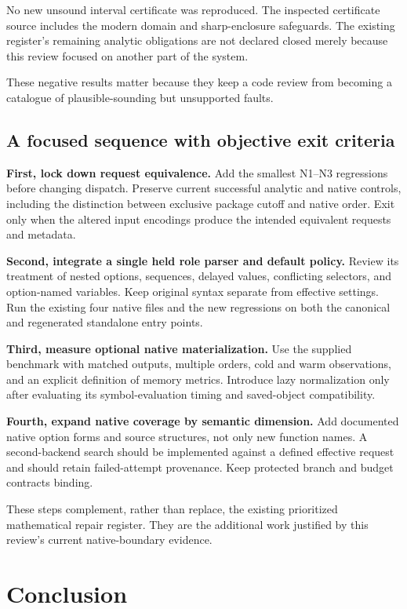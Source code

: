 \documentclass[11pt,a4paper]{article}
\begin{document}
No new unsound interval certificate was reproduced. The inspected certificate source includes the modern domain and sharp-enclosure safeguards. The existing register's remaining analytic obligations are not declared closed merely because this review focused on another part of the system.

These negative results matter because they keep a code review from becoming a catalogue of plausible-sounding but unsupported faults.

\subsection{A focused sequence with objective exit criteria}

\textbf{First, lock down request equivalence.} Add the smallest N1--N3 regressions before changing dispatch. Preserve current successful analytic and native controls, including the distinction between exclusive package cutoff and native order. Exit only when the altered input encodings produce the intended equivalent requests and metadata.

\textbf{Second, integrate a single held role parser and default policy.} Review its treatment of nested options, sequences, delayed values, conflicting selectors, and option-named variables. Keep original syntax separate from effective settings. Run the existing four native files and the new regressions on both the canonical and regenerated standalone entry points.

\textbf{Third, measure optional native materialization.} Use the supplied benchmark with matched outputs, multiple orders, cold and warm observations, and an explicit definition of memory metrics. Introduce lazy normalization only after evaluating its symbol-evaluation timing and saved-object compatibility.

\textbf{Fourth, expand native coverage by semantic dimension.} Add documented native option forms and source structures, not only new function names. A second-backend search should be implemented against a defined effective request and should retain failed-attempt provenance. Keep protected branch and budget contracts binding.

These steps complement, rather than replace, the existing prioritized mathematical repair register. They are the additional work justified by this review's current native-boundary evidence.

\section{Conclusion}
\end{document}
